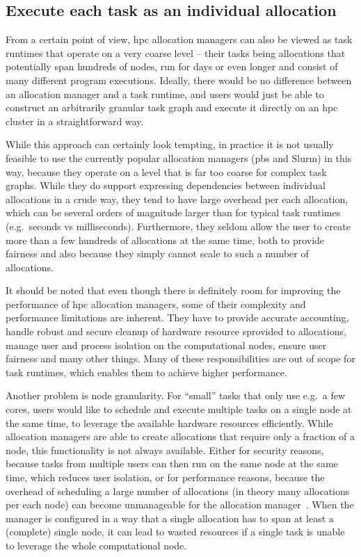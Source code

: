 \subsection*{Execute each task as an individual allocation}
From a certain point of view, \gls{hpc} allocation managers can also be viewed as
task runtimes that operate on a very coarse level -- their tasks being allocations that potentially
span hundreds of nodes, run for days or even longer and consist of many different program
executions. Ideally, there would be no difference between an allocation manager and a task runtime,
and users would just be able to construct an arbitrarily granular task graph and execute it
directly on an \gls{hpc} cluster in a straightforward way.

While this approach can certainly look tempting, in practice it is not usually feasible to use the
currently popular allocation managers (\gls{pbs} and Slurm) in this way, because
they operate on a level that is far too coarse for complex task graphs. While they do support
expressing dependencies between individual allocations in a crude way, they tend to have large
overhead per each allocation, which can be several orders of magnitude
larger than for typical task runtimes (e.g.\ seconds vs milliseconds). Furthermore, they seldom
allow the user to create more than a few hundreds of allocations at the same time, both to provide
fairness and also because they simply cannot scale to such a number of allocations.

It should be noted that even though there is definitely room for improving the performance of
\gls{hpc} allocation managers, some of their complexity and performance
limitations are inherent. They have to provide accurate accounting, handle robust and secure
cleanup of hardware resource sprovided to allocations, manage user and process isolation on the
computational nodes, ensure user fairness and many other things. Many of these responsibilities are
out of scope for task runtimes, which enables them to achieve higher performance.

Another problem is node granularity. For ``small'' tasks that only use e.g.\ a few cores, users
would like to schedule and execute multiple tasks on a single node at the same time, to leverage
the available hardware resources efficiently. While allocation managers are able to create
allocations that require only a fraction of a node, this functionality is not always available.
Either for security reasons, because tasks from multiple users can then run on the same node at the
same time, which reduces user isolation, or for performance reasons, because the overhead of
scheduling a large number of allocations (in theory many allocations per each node) can become
unmanageable for the allocation manager~\cite{it4i_node_scheduling_policy}. When the manager is configured
in a way that a single allocation has to span at least a (complete) single node, it can lead to
wasted resources if a single task is unable to leverage the whole computational node.

